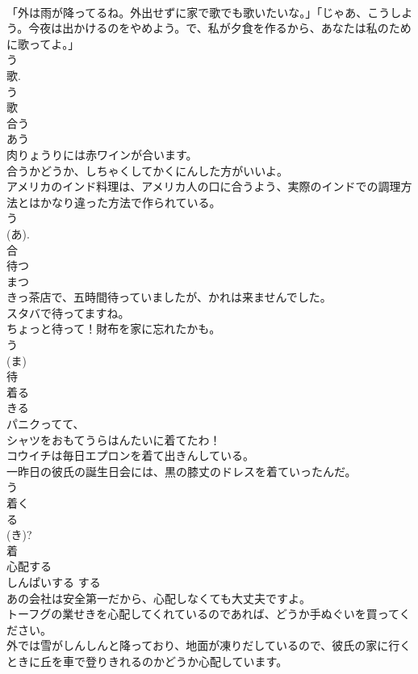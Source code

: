 \documentclass[8pt]{extreport}
\begin{document}
\begin{CJK}{UTF8}{min}
\\	「外は雨が降ってるね。外出せずに家で歌でも歌いたいな。」「じゃあ、こうしよう。今夜は出かけるのをやめよう。で、私が夕食を作るから、あなたは私のために歌ってよ。」	
\\	う 
\\	歌. 
\\	う 
\\	歌	
\\	合う	
\\	あう	
\\	肉りょうりには赤ワインが合います。	
\\	合うかどうか、しちゃくしてかくにんした方がいいよ。	
\\	アメリカのインド料理は、アメリカ人の口に合うよう、実際のインドでの調理方法とはかなり違った方法で作られている。	
\\	う 
\\	(あ). 
\\	合	
\\	待つ	
\\	まつ	
\\	きっ茶店で、五時間待っていましたが、かれは来ませんでした。	
\\	スタバで待ってますね。	
\\	ちょっと待って！財布を家に忘れたかも。	
\\	う 
\\	(ま) 
\\	待	
\\	着る	
\\	きる	
\\	パニクってて、
\\	シャツをおもてうらはんたいに着てたわ！	
\\	コウイチは毎日エプロンを着て出きんしている。	
\\	一昨日の彼氏の誕生日会には、黒の膝丈のドレスを着ていったんだ。	
\\	う 
\\	着く 
\\	る 
\\	(き)? 
\\	着	
\\	心配する	
\\	しんぱいする	する 
\\	あの会社は安全第一だから、心配しなくても大丈夫ですよ。	
\\	トーフグの業せきを心配してくれているのであれば、どうか手ぬぐいを買ってください。	
\\	外では雪がしんしんと降っており、地面が凍りだしているので、彼氏の家に行くときに丘を車で登りきれるのかどうか心配しています。	

\end{CJK}
\end{document}
